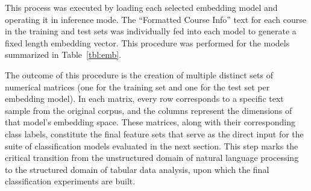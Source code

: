 This process was executed by loading each selected embedding model and operating it in inference mode. The ``Formatted Course Info'' text for each course in the training and test sets was individually fed into each model to generate a fixed length embedding vector. This procedure was performed for the models summarized in Table~\ref{tbl:emb}.
\begin{table}[!hbt]
    \footnotesize
    \caption{Embedding Models \& PCA Explained Variance}
    \centering
    \label{tbl:emb}
\end{table}

The outcome of this procedure is the creation of multiple distinct sets of numerical matrices (one for the training set and one for the test set per embedding model). In each matrix, every row corresponds to a specific text sample from the original corpus, and the columns represent the dimensions of that model's embedding space. These matrices, along with their corresponding class labels, constitute the final feature sets that serve as the direct input for the suite of classification models evaluated in the next section. This step marks the critical transition from the unstructured domain of natural language processing to the structured domain of tabular data analysis, upon which the final classification experiments are built.

